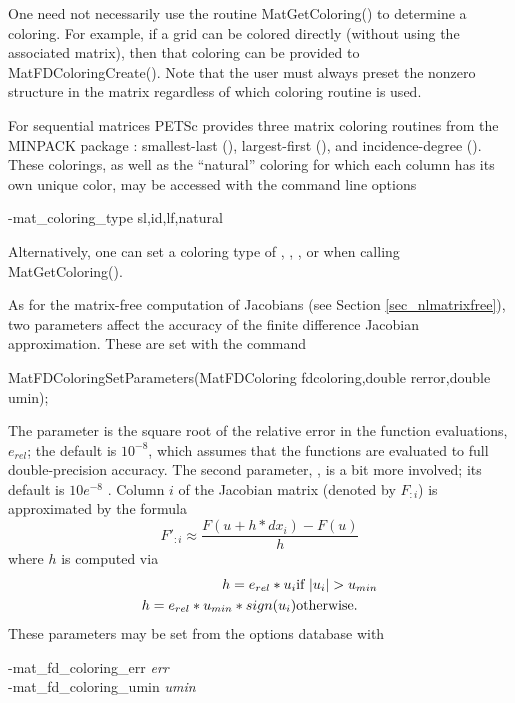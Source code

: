 One need not necessarily use the routine MatGetColoring() to
determine a coloring.  For example, if a grid can be colored directly
(without using the associated matrix), then that coloring can be provided
to MatFDColoringCreate().  Note that the user must always
preset the nonzero structure in the matrix regardless of which
coloring routine is used.

For sequential matrices PETSc provides three matrix coloring routines from the 
MINPACK package \cite{more84}: smallest-last (), largest-first (),
and incidence-degree ().  These colorings, as well as the ``natural'' coloring 
for which each column has its own unique color, may be accessed with the command line options
\begin{tabbing}
   -mat\_coloring\_type \trl{<}sl,id,lf,natural\trl{>}
\end{tabbing}
Alternatively, one can set a coloring type of , , , or  
when calling MatGetColoring().   
 

As for the matrix-free computation of Jacobians (see Section
\ref{sec_nlmatrixfree}), two parameters affect the accuracy of the
finite difference Jacobian approximation.  These are set with the command
\begin{tabbing}
  MatFDColoringSetParameters(MatFDColoring fdcoloring,double rerror,double umin);
\end{tabbing}
The parameter  is the square root of 
the relative error in the function evaluations, $e_{rel}$; the default is $ 10^{-8} $, which assumes
that the functions are evaluated to full double-precision accuracy. The 
second parameter, , is a bit more involved; its default is 
$ 10e^{-8} $ .  Column $i$ of the Jacobian matrix (denoted by $F_{:i}$) is 
approximated by the formula
\[
    F'_{:i} \approx \frac{F(u + h*dx_{i}) - F(u)}{h}
\]
where $ h $ is computed via 
\begin{eqnarray*}
        h = e_{rel}*u_{i}             &    \hbox{if }  |u_{i}| > u_{min} \\
        h = e_{rel}*u_{min}*sign(u_{i})  &    \hbox{otherwise}.
\end{eqnarray*}
These parameters may be set from the options database with 
\begin{tabbing}
   -mat\_fd\_coloring\_err {\em err}\\
   -mat\_fd\_coloring\_umin {\em umin}
\end{tabbing}
 


